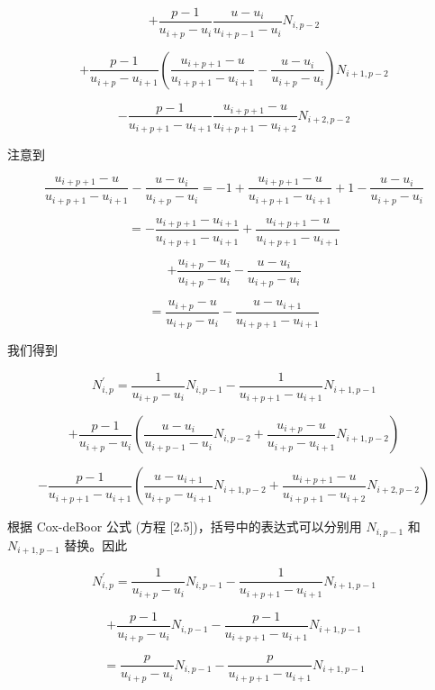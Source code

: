 \documentclass[../main.tex]{subfiles}
\begin{document}
\[
+ \frac{p - 1}{{u}_{i + p} - {u}_{i}}\frac{u - {u}_{i}}{{u}_{i + p - 1} - {u}_{i}}{N}_{i,p - 2}
\]

\[
+ \frac{p - 1}{{u}_{i + p} - {u}_{i + 1}}\left( {\frac{{u}_{i + p + 1} - u}{{u}_{i + p + 1} - {u}_{i + 1}} - \frac{u - {u}_{i}}{{u}_{i + p} - {u}_{i}}}\right) {N}_{i + 1,p - 2}
\]

\[
- \frac{p - 1}{{u}_{i + p + 1} - {u}_{i + 1}}\frac{{u}_{i + p + 1} - u}{{u}_{i + p + 1} - {u}_{i + 2}}{N}_{i + 2,p - 2}
\]

注意到

\[
\frac{{u}_{i + p + 1} - u}{{u}_{i + p + 1} - {u}_{i + 1}} - \frac{u - {u}_{i}}{{u}_{i + p} - {u}_{i}} =  - 1 + \frac{{u}_{i + p + 1} - u}{{u}_{i + p + 1} - {u}_{i + 1}} + 1 - \frac{u - {u}_{i}}{{u}_{i + p} - {u}_{i}}
\]

\[
=  - \frac{{u}_{i + p + 1} - {u}_{i + 1}}{{u}_{i + p + 1} - {u}_{i + 1}} + \frac{{u}_{i + p + 1} - u}{{u}_{i + p + 1} - {u}_{i + 1}}
\]

\[
+ \frac{{u}_{i + p} - {u}_{i}}{{u}_{i + p} - {u}_{i}} - \frac{u - {u}_{i}}{{u}_{i + p} - {u}_{i}}
\]

\[
= \frac{{u}_{i + p} - u}{{u}_{i + p} - {u}_{i}} - \frac{u - {u}_{i + 1}}{{u}_{i + p + 1} - {u}_{i + 1}}
\]

我们得到

\[
{N}_{i,p}^{\prime } = \frac{1}{{u}_{i + p} - {u}_{i}}{N}_{i,p - 1} - \frac{1}{{u}_{i + p + 1} - {u}_{i + 1}}{N}_{i + 1,p - 1}
\]

\[
+ \frac{p - 1}{{u}_{i + p} - {u}_{i}}\left( {\frac{u - {u}_{i}}{{u}_{i + p - 1} - {u}_{i}}{N}_{i,p - 2} + \frac{{u}_{i + p} - u}{{u}_{i + p} - {u}_{i + 1}}{N}_{i + 1,p - 2}}\right)
\]

\[
- \frac{p - 1}{{u}_{i + p + 1} - {u}_{i + 1}}\left( {\frac{u - {u}_{i + 1}}{{u}_{i + p} - {u}_{i + 1}}{N}_{i + 1,p - 2} + \frac{{u}_{i + p + 1} - u}{{u}_{i + p + 1} - {u}_{i + 2}}{N}_{i + 2,p - 2}}\right)
\]

根据 Cox-deBoor 公式 (方程 [2.5])，括号中的表达式可以分别用 \({N}_{i,p - 1}\) 和 \({N}_{i + 1,p - 1}\) 替换。因此

\[
{N}_{i,p}^{\prime } = \frac{1}{{u}_{i + p} - {u}_{i}}{N}_{i,p - 1} - \frac{1}{{u}_{i + p + 1} - {u}_{i + 1}}{N}_{i + 1,p - 1}
\]

\[
+ \frac{p - 1}{{u}_{i + p} - {u}_{i}}{N}_{i,p - 1} - \frac{p - 1}{{u}_{i + p + 1} - {u}_{i + 1}}{N}_{i + 1,p - 1}
\]

\[
= \frac{p}{{u}_{i + p} - {u}_{i}}{N}_{i,p - 1} - \frac{p}{{u}_{i + p + 1} - {u}_{i + 1}}{N}_{i + 1,p - 1}
\]
\end{document}
